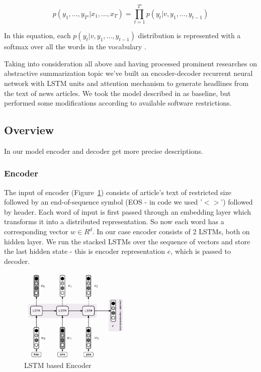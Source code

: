 $$p(y_1, ..., y_{T′}|x_1, ..., x_T ) = \prod_{t=1}^{T'} p(y_t|v, y_1, ..., y_{t-1}) $$


In this equation, each $p(y_t|v, y_1, ..., y_{t-1})$ distribution is represented with a softmax over all the
words in the vocabulary \cite{seq2seq_with_NN}.

Taking into consideration all above and having processed prominent researches on abstractive summarization topic we've built an encoder-decoder recurrent neural network with LSTM units and attention mechanism to generate headlines from the text of news articles. We took the model described in \cite{basic-article} as baseline, but performed some modifications according to available software restrictions.

\subsection{Overview}
In our model encoder and decoder get more precise descriptions. 

\subsubsection{Encoder}
The input of encoder (Figure~\ref{fig:encoder}) consists of article's text of restricted size followed by an end-of-sequence symbol (EOS - in code we used '$<>$') followed by header. Each word of input is first passed through an embedding layer which transforms it into a distributed representation. So now each word has a corresponding vector $w \in R^d$.
In our case encoder consists of 2 LSTMs, both on hidden layer. We run the stacked LSTMs over the sequence of vectors and store the last hidden state - this is encoder representation $e$, which is passed to decoder.  

\begin{figure}[h]
\centering
	\includegraphics[width=0.5\textwidth]{img/seq2seq_vanilla_encoder.png}
	\caption{\label{fig:encoder}LSTM based Encoder}
\end{figure}

